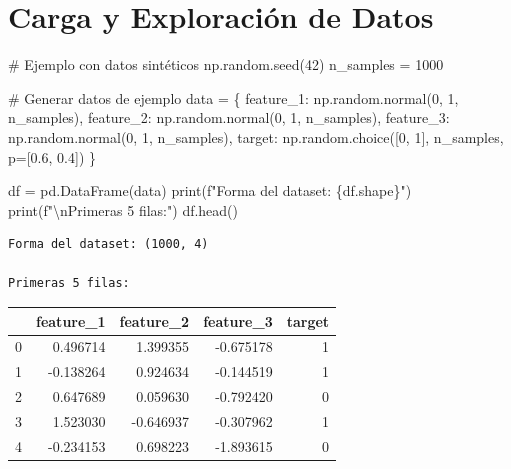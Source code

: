 \documentclass[
]{article}
\newenvironment{Shaded}{\begin{snugshade}}{\end{snugshade}}
\newcommand{\BuiltInTok}[1]{\textcolor[rgb]{0.00,0.23,0.31}{#1}}
\newcommand{\CharTok}[1]{\textcolor[rgb]{0.13,0.47,0.30}{#1}}
\newcommand{\CommentTok}[1]{\textcolor[rgb]{0.37,0.37,0.37}{#1}}
\newcommand{\DecValTok}[1]{\textcolor[rgb]{0.68,0.00,0.00}{#1}}
\newcommand{\FloatTok}[1]{\textcolor[rgb]{0.68,0.00,0.00}{#1}}
\newcommand{\NormalTok}[1]{\textcolor[rgb]{0.00,0.23,0.31}{#1}}
\newcommand{\OperatorTok}[1]{\textcolor[rgb]{0.37,0.37,0.37}{#1}}
\newcommand{\SpecialCharTok}[1]{\textcolor[rgb]{0.37,0.37,0.37}{#1}}
\newcommand{\SpecialStringTok}[1]{\textcolor[rgb]{0.13,0.47,0.30}{#1}}
\newcommand{\StringTok}[1]{\textcolor[rgb]{0.13,0.47,0.30}{#1}}
\begin{document}
\section{Carga y Exploración de
Datos}\label{carga-y-exploraciuxf3n-de-datos}

\begin{Shaded}
\begin{Highlighting}[]
\CommentTok{\# Ejemplo con datos sintéticos}
\NormalTok{np.random.seed(}\DecValTok{42}\NormalTok{)}
\NormalTok{n\_samples }\OperatorTok{=} \DecValTok{1000}

\CommentTok{\# Generar datos de ejemplo}
\NormalTok{data }\OperatorTok{=}\NormalTok{ \{}
    \StringTok{\textquotesingle{}feature\_1\textquotesingle{}}\NormalTok{: np.random.normal(}\DecValTok{0}\NormalTok{, }\DecValTok{1}\NormalTok{, n\_samples),}
    \StringTok{\textquotesingle{}feature\_2\textquotesingle{}}\NormalTok{: np.random.normal(}\DecValTok{0}\NormalTok{, }\DecValTok{1}\NormalTok{, n\_samples),}
    \StringTok{\textquotesingle{}feature\_3\textquotesingle{}}\NormalTok{: np.random.normal(}\DecValTok{0}\NormalTok{, }\DecValTok{1}\NormalTok{, n\_samples),}
    \StringTok{\textquotesingle{}target\textquotesingle{}}\NormalTok{: np.random.choice([}\DecValTok{0}\NormalTok{, }\DecValTok{1}\NormalTok{], n\_samples, p}\OperatorTok{=}\NormalTok{[}\FloatTok{0.6}\NormalTok{, }\FloatTok{0.4}\NormalTok{])}
\NormalTok{\}}

\NormalTok{df }\OperatorTok{=}\NormalTok{ pd.DataFrame(data)}
\BuiltInTok{print}\NormalTok{(}\SpecialStringTok{f"Forma del dataset: }\SpecialCharTok{\{}\NormalTok{df}\SpecialCharTok{.}\NormalTok{shape}\SpecialCharTok{\}}\SpecialStringTok{"}\NormalTok{)}
\BuiltInTok{print}\NormalTok{(}\SpecialStringTok{f"}\CharTok{\textbackslash{}n}\SpecialStringTok{Primeras 5 filas:"}\NormalTok{)}
\NormalTok{df.head()}
\end{Highlighting}
\end{Shaded}

\begin{verbatim}
Forma del dataset: (1000, 4)

Primeras 5 filas:
\end{verbatim}

\label{load-data}
\begin{tabular}{lrrrr}
\toprule
{} &  feature\_1 &  feature\_2 &  feature\_3 &  target \\
\midrule
0 &   0.496714 &   1.399355 &  -0.675178 &       1 \\
1 &  -0.138264 &   0.924634 &  -0.144519 &       1 \\
2 &   0.647689 &   0.059630 &  -0.792420 &       0 \\
3 &   1.523030 &  -0.646937 &  -0.307962 &       1 \\
4 &  -0.234153 &   0.698223 &  -1.893615 &       0 \\
\bottomrule
\end{tabular}
\end{document}
